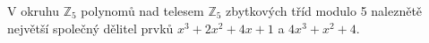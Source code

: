 V okruhu $\mathbb{Z}_{5}$ polynomů nad telesem $\mathbb{Z}_{5}$ zbytkových tříd
modulo 5 naleznětě největší společný dělitel prvků $x^{3}+2x^{2}+4x+1$ a
$4x^{3}+x^{2}+4$.
